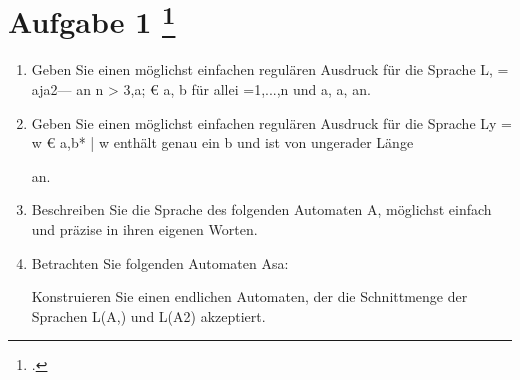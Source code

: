 \documentclass{lehramt-informatik-aufgabe}
\begin{document}
\section{Aufgabe 1
\footcite{66115:2016:03}}

\begin{enumerate}


\item Geben Sie einen möglichst einfachen regulären Ausdruck für die
Sprache L, = aja2--- an n > 3,a; € {a, b} für allei =1,...,n und a,
a, an.


\item Geben Sie einen möglichst einfachen regulären Ausdruck für die
Sprache Ly = {w € {a,b}* | w enthält genau ein b und ist von ungerader
Länge}

an.


\item Beschreiben Sie die Sprache des folgenden Automaten A,
möglichst einfach und präzise in ihren eigenen Worten.

\begin{liAntwort}

\end{liAntwort}


\item Betrachten Sie folgenden Automaten Asa:

Konstruieren Sie einen endlichen Automaten, der die Schnittmenge der
Sprachen L(A,) und L(A2) akzeptiert.
\end{enumerate}
\end{document}
